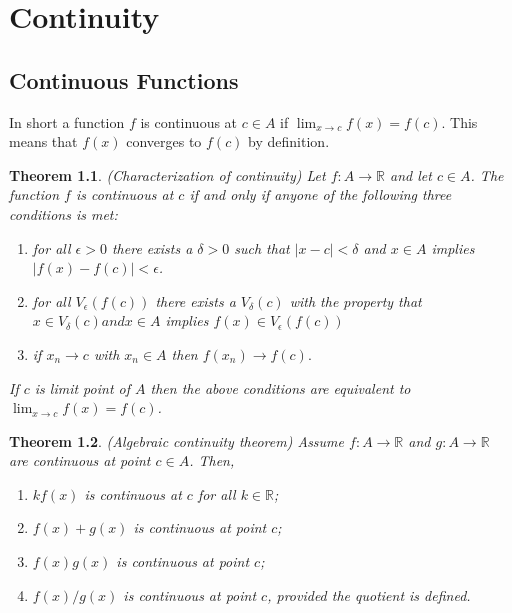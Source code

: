 \documentclass[10pt]{amsbook}
\newtheorem{theorem}{Theorem}
\begin{document}
\chapter{Continuity}
\section{Continuous Functions}
In short  a function $f$ is continuous at $c \in A$ if $\lim_{x\to c} f\left(x\right) = f\left(c\right)$. This means that $f\left(x\right)$ converges to $f\left(c\right)$ by definition.

\begin{theorem}
    (Characterization of continuity)
    Let $f \colon A \to \mathbb{R}$ and let $c \in A$. The function $f$ is continuous at $c$ if and only if anyone of the following three conditions is met:

    \begin{enumerate}[label=(\roman*)]
    \item for all $\epsilon > 0$ there exists a $\delta > 0$ such that $\left|x-c\right| < \delta$ and $x \in A$ implies $\left|f\left(x\right) - f\left(c\right)\right| < \epsilon$.
    \item for all $V_{\epsilon}\left(f\left(c\right)\right)$ there exists a $V_{\delta}\left(c\right)$ with the property that $x \in V_{\delta}\left(c\right) and x \in A$ implies $f\left(x\right) \in V_{\epsilon}\left(f\left(c\right)\right)$
    \item if $x_{n} \to c$ with $x_{n} \in A$ then $f\left(x_{n}\right) \to f\left(c\right).$
    \end{enumerate}
    If $c$ is limit point of $A$ then the above conditions are equivalent to  $\lim_{x\to c} f\left(x\right) = f\left(c\right)$.
    
\end{theorem}

\begin{theorem}
    (Algebraic continuity theorem)
    Assume $f \colon A \to \mathbb{R}$ and $g \colon A \to \mathbb{R}$ are continuous at point $c \in A$. Then,

    \begin{enumerate}[label=(\roman*)]
    \item $kf\left(x\right)$ is continuous at $c$ for all $k \in \mathbb{R}$;
    \item $f\left(x\right) + g\left(x\right)$ is continuous at point $c$;
    \item $f\left(x\right)g\left(x\right)$ is continuous at point $c$;
    \item $f\left(x\right) / g\left(x\right)$ is continuous at point $c$, provided the quotient is defined.
    \end{enumerate}

    
\end{theorem}
\end{document}
